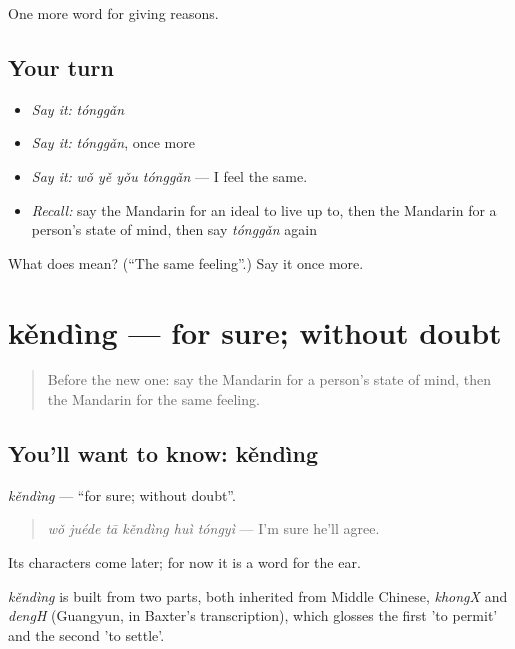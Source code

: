 \begin{grammarlens}[title={What you've built}]
One more word for giving reasons.
\end{grammarlens}

\subsection*{Your turn}
\begin{itemize}
\raggedright
  \item \emph{Say it:} \emph{tónggǎn}
  \item \emph{Say it:} \emph{tónggǎn}, once more
  \item \emph{Say it:} \emph{wǒ yě yǒu tónggǎn} — I feel the same.
  \item \emph{Recall:} say the Mandarin for an ideal to live up to, then the Mandarin for a person's state of mind, then say \emph{tónggǎn} again
\end{itemize}

\begin{tcolorbox}[breakable,colback=teal!4,colframe=teal!35!black,title={Before you move on}]
What does  mean? (\textquotedblleft{}The same feeling\textquotedblright{}.) Say it once more.
\end{tcolorbox}
\section[kěndìng]{kěndìng — for sure; without doubt}

\label{lesson:ZH-C352-kending}



\begin{quote}
Before the new one: say the Mandarin for a person's state of mind, then the Mandarin for the same feeling.
\end{quote}

\subsection*{You'll want to know: kěndìng}
\emph{kěndìng} — \textquotedblleft{}for sure; without doubt\textquotedblright{}.

\begin{quote}
\emph{wǒ juéde tā kěndìng huì tóngyì} — I'm sure he'll agree.
\end{quote}

Its characters come later; for now it is a word for the ear.

\begin{cousinweb}
\emph{kěndìng} is built from two parts, both inherited from Middle Chinese, \emph{khongX} and \emph{dengH} (Guangyun, in Baxter's transcription), which glosses the first 'to permit' and the second 'to settle'.
\end{cousinweb}

